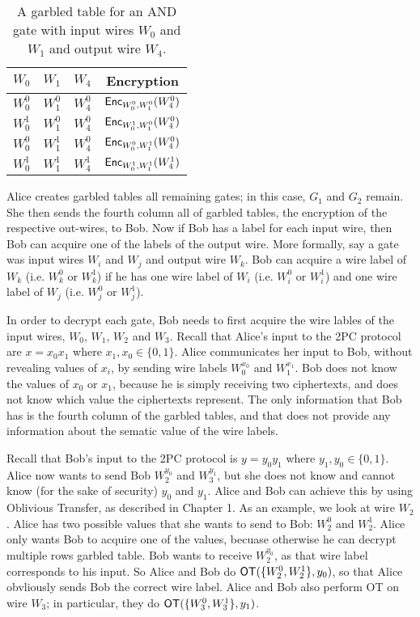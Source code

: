 \begin{table}[h]
\centering
\label{tbl:g0-table}
\begin{tabular}{|c|c|c|c|}
\hline
$W_0$ & $W_1$ & $W_4$ & Encryption \\
\hline
$W_0^0$ & $W_1^0$ & $W_4^0$ & $\textsf{Enc}_{W_0^0, W_1^0}(W_4^0)$ \\
$W_0^1$ & $W_1^0$ & $W_4^0$ & $\textsf{Enc}_{W_0^1, W_1^0}(W_4^0)$ \\
$W_0^0$ & $W_1^1$ & $W_4^0$ & $\textsf{Enc}_{W_0^0, W_1^1}(W_4^0)$ \\
$W_0^1$ & $W_1^1$ & $W_4^1$ & $\textsf{Enc}_{W_0^1, W_1^1}(W_4^1)$ \\
\hline
\end{tabular}
\caption{A garbled table for an AND gate with input wires $W_0$ and $W_1$ and output wire $W_4$.}
\end{table}

Alice creates garbled tables all remaining gates; in this case, $G_1$ and $G_2$ remain.
She then sends the fourth column all of garbled tables, the encryption of the respective out-wires, to Bob.
Now if Bob has a label for each input wire, then Bob can acquire one of the labels of the output wire.
More formally, say a gate was input wires $W_i$ and $W_j$ and output wire $W_k$.
Bob can acquire a wire label of $W_k$ (i.e. $W_k^0$ or $W_k^1$) if he has one wire label of $W_i$ (i.e. $W_i^0$ or $W_i^1$) and one wire label of $W_j$ (i.e. $W_j^0$ or $W_j^1$).

In order to decrypt each gate, Bob needs to first acquire the wire lables of the input wires, $W_0$, $W_1$, $W_2$ and $W_3$.
Recall that Alice's input to the 2PC protocol are $x = x_0x_1$ where $x_1, x_0 \in \{0,1\}$.
Alice communicates her input to Bob, without revealing values of $x_i$, by sending wire labels $W_0^{x_0}$ and $W_1^{x_1}$.
Bob does not know the values of $x_0$ or $x_1$, because he is simply receiving two ciphertexts, and does not know which value the ciphertexts represent.
The only information that Bob has is the fourth column of the garbled tables, and that does not provide any information about the sematic value of the wire labels.

Recall that Bob's input to the 2PC protocol is $y = y_0 y_1$ where $y_1, y_0 \in \{0,1\}$.
Alice now wants to send Bob $W_2^{y_0}$ and $W_3^{y_1}$, but she does not know and cannot know (for the sake of security) $y_0$ and $y_1$.
Alice and Bob can achieve this by using Oblivious Transfer, as described in Chapter 1.
As an example, we look at wire $W_2$.
Alice has two possible values that she wants to send to Bob: $W_2^0$ and $W_2^1$.
Alice only wants Bob to acquire one of the values, becuase otherwise he can decrypt multiple rows garbled table.
Bob wants to receive $W_2^{y_0}$, as that wire label corresponds to his input.
So Alice and Bob do $\textsf{OT}(\{W_2^0, W_2^1\}, y_0)$, so that Alice obvliously sends Bob the correct wire label.
Alice and Bob also perform OT on wire $W_3$; in particular, they do $\textsf{OT}(\{W_3^0, W_3^1\}, y_1)$.

